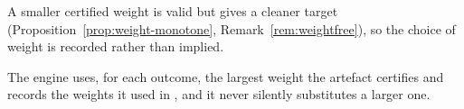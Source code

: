 
A smaller certified weight is valid but gives a cleaner target
(Proposition~\ref{prop:weight-monotone}, Remark~\ref{rem:weightfree}), so the
choice of weight is recorded rather than implied.

\begin{requirement}
\label{req:largest-certified-weight}
The engine uses, for each outcome, the largest weight the artefact certifies
and records the weights it used in , and it never silently
substitutes a larger one.
\end{requirement}
